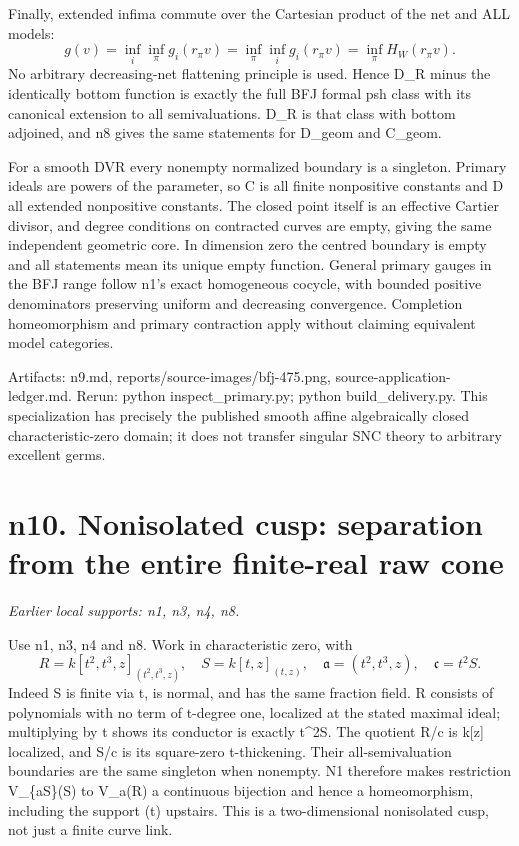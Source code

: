 \documentclass[11pt]{article}
\begin{document}
Finally, extended infima commute over the Cartesian product of the net and ALL models:
\[
g(v)=\inf_i\inf_\pi g_i(r_\pi v)
=\inf_\pi\inf_i g_i(r_\pi v)
=\inf_\pi H_W(r_\pi v).
\]
No arbitrary decreasing-net flattening principle is used. Hence D\_R minus the identically bottom function is exactly the full BFJ formal psh class with its canonical extension to all semivaluations. D\_R is that class with bottom adjoined, and n8 gives the same statements for D\_geom and C\_geom.

For a smooth DVR every nonempty normalized boundary is a singleton. Primary ideals are powers of the parameter, so C is all finite nonpositive constants and D all extended nonpositive constants. The closed point itself is an effective Cartier divisor, and degree conditions on contracted curves are empty, giving the same independent geometric core. In dimension zero the centred boundary is empty and all statements mean its unique empty function. General primary gauges in the BFJ range follow n1's exact homogeneous cocycle, with bounded positive denominators preserving uniform and decreasing convergence. Completion homeomorphism and primary contraction apply without claiming equivalent model categories.

Artifacts: n9.md, reports/source-images/bfj-475.png, source-application-ledger.md. Rerun: python inspect\_primary.py; python build\_delivery.py. This specialization has precisely the published smooth affine algebraically closed characteristic-zero domain; it does not transfer singular SNC theory to arbitrary excellent germs.

\section{n10. Nonisolated cusp: separation from the entire finite-real raw cone}
\textit{Earlier local supports: n1, n3, n4, n8.}

Use n1, n3, n4 and n8. Work in characteristic zero, with
\[
R=k[t^2,t^3,z]_{(t^2,t^3,z)},\quad S=k[t,z]_{(t,z)},\quad
\mathfrak a=(t^2,t^3,z),\quad \mathfrak c=t^2S.
\]
Indeed S is finite via t, is normal, and has the same fraction field. R consists of polynomials with no term of t-degree one, localized at the stated maximal ideal; multiplying by t shows its conductor is exactly t\textasciicircum{}2S. The quotient R/c is k[z] localized, and S/c is its square-zero t-thickening. Their all-semivaluation boundaries are the same singleton when nonempty. N1 therefore makes restriction V\_\{aS\}(S) to V\_a(R) a continuous bijection and hence a homeomorphism, including the support (t) upstairs. This is a two-dimensional nonisolated cusp, not just a finite curve link.
\end{document}
